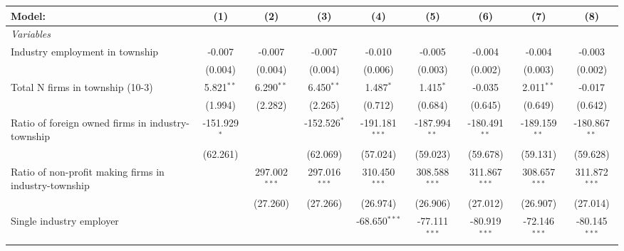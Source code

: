 \begingroup
\centering
\begin{tabular}{lcccccccc}
   \tabularnewline \midrule \midrule
   Model:                                                & (1)            & (2)             & (3)             & (4)              & (5)             & (6)             & (7)             & (8)\\  
   \midrule
   \emph{Variables}\\
   Industry employment in township                       & -0.007         & -0.007          & -0.007          & -0.010           & -0.005          & -0.004          & -0.004          & -0.003\\   
                                                         & (0.004)        & (0.004)         & (0.004)         & (0.006)          & (0.003)         & (0.002)         & (0.003)         & (0.002)\\   
   Total N firms in township (10-3)                      & 5.821$^{**}$   & 6.290$^{**}$    & 6.450$^{**}$    & 1.487$^{*}$      & 1.415$^{*}$     & -0.035          & 2.011$^{**}$    & -0.017\\   
                                                         & (1.994)        & (2.282)         & (2.265)         & (0.712)          & (0.684)         & (0.645)         & (0.649)         & (0.642)\\   
   Ratio of foreign owned firms in industry-township     & -151.929$^{*}$ &                 & -152.526$^{*}$  & -191.181$^{***}$ & -187.994$^{**}$ & -180.491$^{**}$ & -189.159$^{**}$ & -180.867$^{**}$\\   
                                                         & (62.261)       &                 & (62.069)        & (57.024)         & (59.023)        & (59.678)        & (59.131)        & (59.628)\\   
   Ratio of non-profit making firms in industry-township &                & 297.002$^{***}$ & 297.016$^{***}$ & 310.450$^{***}$  & 308.588$^{***}$ & 311.867$^{***}$ & 308.657$^{***}$ & 311.872$^{***}$\\   
                                                         &                & (27.260)        & (27.266)        & (26.974)         & (26.906)        & (27.012)        & (26.907)        & (27.014)\\   
   Single industry employer                              &                &                 &                 & -68.650$^{***}$  & -77.111$^{***}$ & -80.919$^{***}$ & -72.146$^{***}$ & -80.145$^{***}$\\   

\end{tabular}
